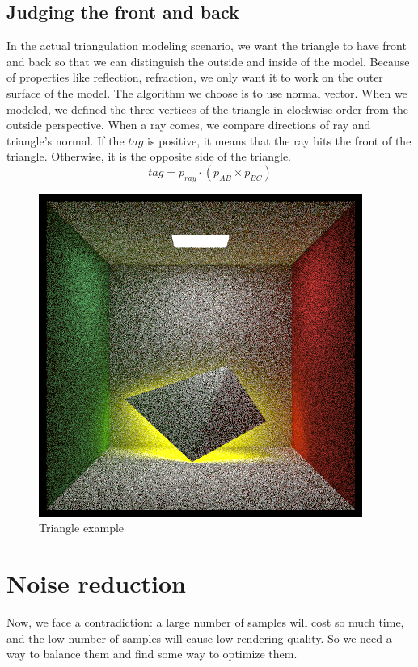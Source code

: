 \documentclass[10pt,conference,compsoc]{IEEEtran}
\begin{document}
	\subsection{Judging the front and back}
	In the actual triangulation modeling scenario, we want the triangle to have front and back so that we can distinguish the outside and inside of the model. Because of properties like reflection, refraction, we only want it to work on the outer surface of the model.
	The algorithm we choose is to use normal vector. When we modeled, we defined the three vertices of the triangle in clockwise order from the outside perspective. When a ray comes, we compare directions of ray and triangle's normal. If the $tag$ is positive, it means that the ray hits the front of the triangle. Otherwise, it is the opposite side of the triangle.
	$$tag = p_{ray} \cdot (p_{AB}  \times {p_{BC}})$$
	
	\begin{figure}[ht]
		\centering
		\includegraphics[scale=0.3]{./pic/triangle_sample.png}
		\caption{Triangle example}
		\label{fig:label}
	\end{figure}

\section{Noise reduction}
Now, we face a contradiction: a large number of samples will cost so much time, and the low number of samples will cause low rendering quality. So we need a way to balance them and find some way to optimize them.
\end{document}
